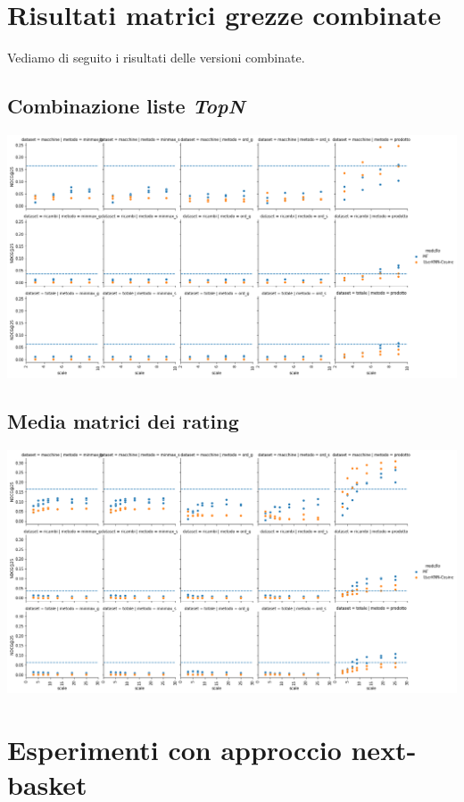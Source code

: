 \section{Risultati matrici grezze combinate}
Vediamo di seguito i risultati delle versioni combinate.

\subsection{Combinazione liste \textit{TopN}}
\includegraphics[width=16cm]{figures/comb_1.png}

\subsection{Media matrici dei rating}
\includegraphics[width=16cm]{figures/comb_2.png}

\section{Esperimenti con approccio next-basket}


